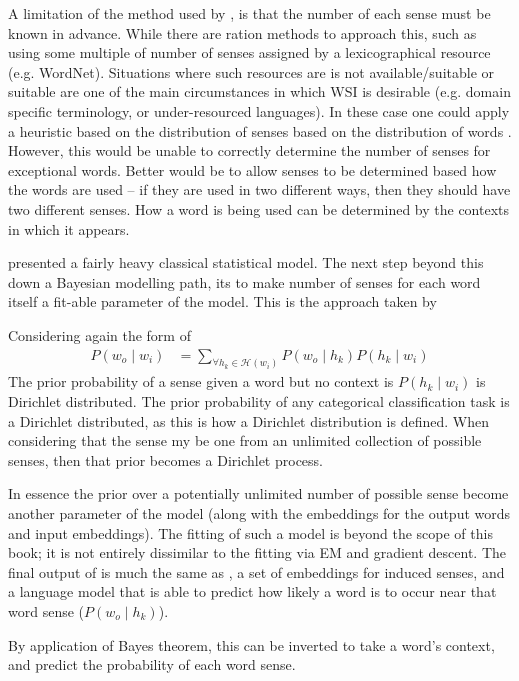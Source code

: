 \documentclass[12pt,parskip]{komatufte}
\begin{document}
A limitation of the method used by , is that the number of each sense must be known in advance.
While there are ration methods to approach this,
such as using some multiple of number of senses assigned by a lexicographical resource (e.g. WordNet).
Situations where such resources are  is not available/suitable or suitable are one of the main circumstances in which WSI is desirable  (e.g. domain specific terminology, or under-resourced languages).
In these case one could apply a heuristic based on the distribution of senses based on the distribution of words \parencite{zipf1945meaning}.
However, this would be unable to correctly determine the number of senses for exceptional words.
Better would be to allow senses to be determined based how the words are used -- if they are used in two different ways, then they should have two different senses.
How a word is being used can be determined by the contexts in which it appears.


 presented a fairly heavy classical statistical model.
The next step beyond this down a Bayesian modelling path,
its to make number of senses for each word itself a fit-able parameter of the model.
This is the approach taken by 

Considering again the form of 
\begin{align}
P(w_o\mid w_i) &= \sum_{\forall h_k \in \mathcal{H}(w_i)} P(w_o \mid h_k) P(h_k \mid w_i) 
\end{align}
The prior probability of a sense given a word but no context is 
$P(h_k \mid w_i)$ is Dirichlet distributed.
The prior probability of any categorical classification task is a Dirichlet distributed, as this is how a Dirichlet distribution is defined.
When considering that the sense my be one from an unlimited collection of possible senses,
then that prior becomes a Dirichlet process.

In essence the prior over a potentially unlimited number of possible sense become another parameter of the model (along with the embeddings for the output words and input embeddings).
The fitting of such a model is beyond the scope of this book;
it is not entirely dissimilar to the fitting via EM and gradient descent.
The final output of  is much the same as ,
a set of embeddings for induced senses,
and a language model that is able to predict how likely a word is to occur near that word sense ($P(w_o \mid h_k)$).

By application of Bayes theorem, this can be inverted to take a word's context,
and predict the probability of each word sense.
\end{document}
